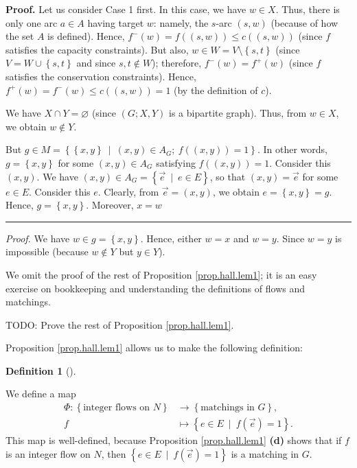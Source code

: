 \documentclass[numbers=enddot,12pt,final,onecolumn,notitlepage]{scrartcl}%
\newcounter{exer}
\theoremstyle{definition}
\newtheorem{defi}[theo]{Definition}
\newenvironment{definition}[1][]
{\begin{defi}[#1]\begin{leftbar}}
{\end{leftbar}\end{defi}}
\newenvironment{proof}[1][Proof]{\noindent\textbf{#1.} }{\ \rule{0.5em}{0.5em}}
\newenvironment{noncompile}{}{}
\begin{document}
\begin{noncompile}
\begin{proof}
Let us consider Case 1 first. In this case, we have $w\in X$. Thus, there is
only one arc $a\in A$ having target $w$: namely, the $s$-arc $\left(
s,w\right)  $ (because of how the set $A$ is defined). Hence, $f^{-}\left(
w\right)  =f\left(  \left(  s,w\right)  \right)  \leq c\left(  \left(
s,w\right)  \right)  $ (since $f$ satisfies the capacity constraints). But
also, $w\in W=V\setminus\left\{  s,t\right\}  $ (since $V=W\cup\left\{
s,t\right\}  $ and since $s,t\notin W$); therefore, $f^{-}\left(  w\right)
=f^{+}\left(  w\right)  $ (since $f$ satisfies the conservation constraints).
Hence, $f^{+}\left(  w\right)  =f^{-}\left(  w\right)  \leq c\left(  \left(
s,w\right)  \right)  =1$ (by the definition of $c$).

We have $X\cap Y=\varnothing$ (since $\left(  G;X,Y\right)  $ is a bipartite
graph). Thus, from $w\in X$, we obtain $w\notin Y$.

But $g\in M=\left\{  \left\{  x,y\right\}  \ \mid\ \left(  x,y\right)  \in
A_{G};\ f\left(  \left(  x,y\right)  \right)  =1\right\}  $. In other words,
$g=\left\{  x,y\right\}  $ for some $\left(  x,y\right)  \in A_{G}$ satisfying
$f\left(  \left(  x,y\right)  \right)  =1$. Consider this $\left(  x,y\right)
$. We have $\left(  x,y\right)  \in A_{G}=\left\{  \overrightarrow{e}%
\ \mid\ e\in E\right\}  $, so that $\left(  x,y\right)  =\overrightarrow{e}$
for some $e\in E$. Consider this $e$. Clearly, from $\overrightarrow{e}%
=\left(  x,y\right)  $, we obtain $e=\left\{  x,y\right\}  =g$. Hence,
$g=\left\{  x,y\right\}  $. Moreover, $x=w$\ \ \ \ 
\end{proof}

\textit{Proof.} We have $w\in g=\left\{  x,y\right\}  $. Hence, either $w=x$
and $w=y$. Since $w=y$ is impossible (because $w\notin Y$ but $y\in Y$).
\end{noncompile}

We omit the proof of the rest of Proposition \ref{prop.hall.lem1}; it is an easy exercise
on bookkeeping and understanding the definitions of flows and matchings.

TODO: Prove the rest of Proposition \ref{prop.hall.lem1}.

Proposition \ref{prop.hall.lem1} allows us to make the following definition:

\begin{definition}
We define a map%
\begin{align*}
\Phi:\left\{  \text{integer flows on }N\right\}   &  \rightarrow\left\{
\text{matchings in }G\right\}  ,\\
f  &  \mapsto\left\{  e\in E\ \mid\ f\left(  \overrightarrow{e}\right)
=1\right\}  .
\end{align*}
This map is well-defined, because Proposition \ref{prop.hall.lem1}
\textbf{(d)} shows that if $f$ is an integer flow on $N$, then $\left\{  e\in
E\ \mid\ f\left(  \overrightarrow{e}\right)  =1\right\}  $ is a matching in
$G$.
\end{definition}
\end{document}

